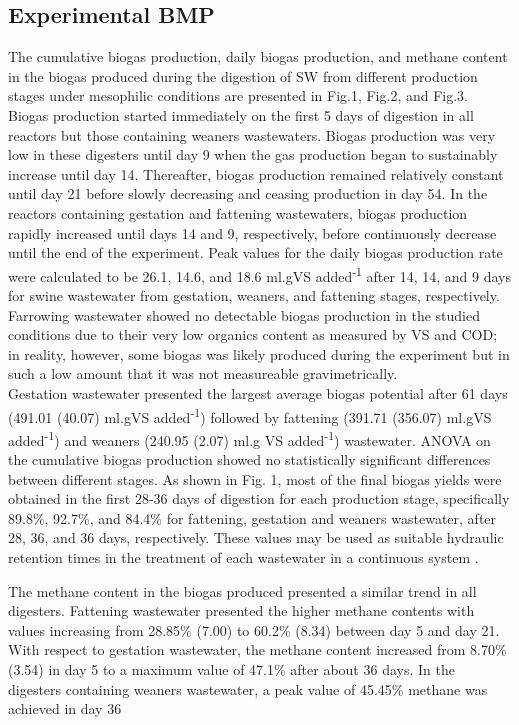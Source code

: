 \subsection{Experimental BMP}
The cumulative biogas production, daily biogas production, and methane content in the biogas produced during the digestion of SW from different production stages under mesophilic conditions are presented in Fig.1, Fig.2, and Fig.3.\\

Biogas production started immediately on the first 5 days of digestion in all reactors but those containing weaners wastewaters. Biogas production was very low in these digesters until day 9 when the gas production began to sustainably increase until day 14. Thereafter, biogas production remained relatively constant until day 21 before slowly decreasing and ceasing production in day 54. In the reactors containing gestation and fattening wastewaters, biogas production rapidly increased until days 14 and 9, respectively, before continuously decrease until the end of the experiment. Peak values for the daily biogas production rate were calculated to be 26.1, 14.6, and 18.6 ml.gVS added\textsuperscript{-1} after 14, 14, and 9 days for swine wastewater from gestation, weaners, and fattening stages, respectively.
Farrowing wastewater showed no detectable biogas production in the studied conditions due to their very low organics content as measured by VS and COD; in reality, however, some biogas was likely produced during the experiment but in such a low amount that it was not measureable gravimetrically.\\
Gestation wastewater presented the largest average biogas potential after 61 days (491.01 (40.07) ml.gVS added\textsuperscript{-1}) followed by fattening (391.71 (356.07) ml.gVS added\textsuperscript{-1}) and weaners (240.95 (2.07) ml.g VS added\textsuperscript{-1}) wastewater. ANOVA on the cumulative biogas production showed no statistically significant differences between different stages. As shown in Fig. 1, most of the final biogas yields were obtained in the first 28-36 days of digestion for each production stage, specifically 89.8\%, 92.7\%, and 84.4\% for fattening, gestation and weaners wastewater, after 28, 36, and 36 days, respectively. These values may be used as suitable hydraulic retention times in the treatment of each wastewater in a continuous system \cite{Li_2013}.

The methane content in the biogas produced presented a similar trend in all digesters. Fattening wastewater presented the higher methane contents with values increasing from 28.85\% (7.00) to 60.2\% (8.34) between day 5 and day 21. With respect to gestation wastewater, the methane content increased from 8.70\% (3.54) in day 5 to a maximum value of 47.1\% after about 36 days. In the digesters containing weaners wastewater, a peak value of 45.45\% methane was achieved in day 36